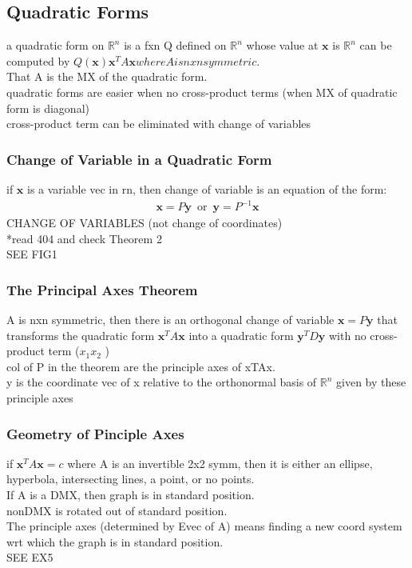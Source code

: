 \documentclass[12pt]{article}
\newcommand{\R}{\mathbb{R}}
\begin{document}
\subsection{Quadratic Forms}
    a quadratic form on $\R^n$  is a fxn Q defined on  $\R^n$  whose
    value at $\bm{x}$  is $\R^n$  can be computed by 
    $ Q(\bm{x}) \bm{x}^TA\bm{x} where A is nxn symmetric. $ \\
    That A is the MX of the quadratic form.\\
    quadratic forms are easier when no cross-product terms (when 
    MX of quadratic form is diagonal)\\
    cross-product term can be eliminated with change of variables
    \subsubsection{Change of Variable in a Quadratic Form}
        if $\bm{x}$  is a variable vec in rn, then change of variable
        is an equation of the form:
        \begin{align*}
            \bm{x} = P\bm{y}\,\,\,\text{or}
            \,\,\, \bm{y}= P^{-1}\bm{x}
        \end{align*}
        CHANGE OF VARIABLES (not change of coordinates)\\
        *read 404 and check Theorem 2\\
        SEE FIG1
    \subsubsection{The Principal Axes Theorem}
        A is nxn symmetric, then there is an orthogonal change of
        variable $\bm{x}= P\bm{y}$  that transforms the
        quadratic form $\bm{x}^TA\bm{x}$  into a quadratic form
        $  \bm{y}^TD\bm{y} $  with no cross-product term ($x_1x_2$ ) \\
        col of P in the theorem are the principle axes of xTAx.\\
        y is the coordinate vec of x relative to the orthonormal basis
        of $\R^n$ given by these principle axes 
    \subsubsection{Geometry of Pinciple Axes}
        if $\bm{x}^TA\bm{x} = c$ where A is an invertible 2x2 symm, then
        it is either an ellipse, hyperbola, intersecting lines, a point,
        or no points.\\
        If A is a DMX, then graph is in standard position.\\
        nonDMX is rotated out of standard position.\\
        The principle axes (determined by Evec of A) means finding
        a new coord system wrt which the graph is in standard position.\\
        SEE EX5
\end{document}
